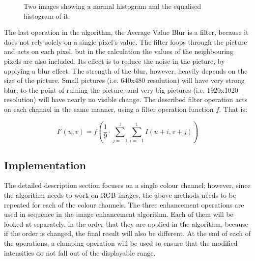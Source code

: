 \documentclass[journal,transmag]{IEEEtran}
\begin{document}
\begin{figure}
		\centering
		\caption{Two images showing a normal histogram and the equalised histogram of it.}
		\label{fig:equal_hist}
\end{figure}

The last operation in the algorithm, the Average Value Blur is a filter, because it does not rely solely on a single pixel's value. The filter loops through the picture and acts on each pixel, but in the calculation the values of the neighbouring pixels are also included. Its effect is to reduce the noise in the picture, by applying a blur effect.\cite{averageFilter} The strength of the blur, however, heavily depends on the size of the picture. Small pictures (i.e. 640x480 resolution) will have very strong blur, to the point of ruining the picture, and very big pictures (i.e. 1920x1020 resolution) will have nearly no visible change. The described filter operation acts on each channel in the same manner, using a filter operation function $f$. That is: 

\begin{equation}\label{eq:avgFilter} %
I'(u, v) = f(\frac{1}{9}\cdot\sum_{j=-1}^{1}\sum_{i=-1}^{1}I(u+i, v+j))
\end{equation}

\subsection{Implementation}
The detailed description section focuses on a single colour channel; however, since the algorithm needs to work on RGB images, the above methods needs to be repeated for each of the colour channels. The three enhancement operations are used in sequence in the image enhancement algorithm. Each of them will be looked at separately, in the order that they are applied in the algorithm, because if the order is changed, the final result will also be different. At the end of each of the operations, a clamping operation will be used to ensure that the modified intensities do not fall out of the displayable range.
\end{document}
